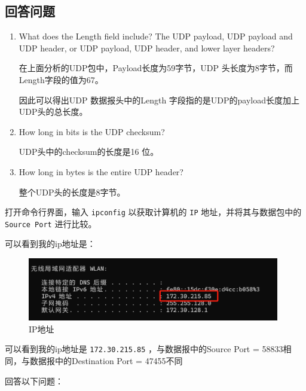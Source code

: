 \documentclass{article}
\begin{document}
	\subsection{回答问题}
	
	\begin{enumerate}[label={\arabic*})]
		\item What does the Length field include? The UDP payload, UDP payload and UDP header, or UDP payload, UDP header, and lower layer headers?
		
		在上面分析的UDP包中，Payload长度为59字节，UDP 头长度为8字节，而Length字段的值为67。
		
		因此可以得出UDP 数据报头中的Length 字段指的是UDP的payload长度加上UDP头的总长度。
		
		\item How long in bits is the UDP checksum?
		
		UDP头中的checksum的长度是16 位。
		
		\item How long in bytes is the entire UDP header? 
		
		整个UDP头的长度是8字节。
	\end{enumerate}
	
	打开命令行界面，输入 \texttt{ipconfig} 以获取计算机的 \texttt{IP} 地址，并将其与数据包中的 \texttt{Source Port} 进行比较。
	
	可以看到我的ip地址是：
	
	\begin{figure}[H]
		\centering
		\includegraphics[width=11cm]{images/10.IP地址.png}
		\caption{IP地址}
	\end{figure}
	
	可以看到我的ip地址是 \texttt{172.30.215.85} ，与数据报中的Source Port = 58833相同，与数据报中的Destination Port = 47455不同
	
	回答以下问题：
	
\end{document}
